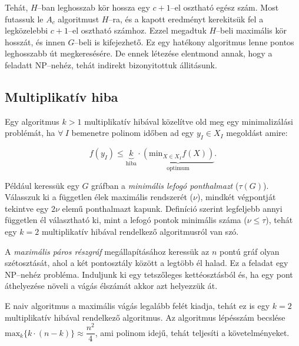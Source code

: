 Tehát, $H$--ban leghosszab kör hossza egy $c+1$--el osztható egész szám.  Most
futassuk le $A_c$ algoritmust $H$--ra, és a kapott eredményt kerekitsük fel a
legközelebbi $c+1$--el osztható számhoz. Ezzel megadtuk $H$--beli maximális kör
hosszát, és innen $G$--beli is kifejezhető. Ez egy hatékony algoritmus lenne
pontos leghosszabb út megkeresésére. De ennek létezése elentmond annak, hogy a
feladatt NP--nehéz, tehát indirekt bizonyitottuk állitásunk.

\subsection{Multiplikatív hiba}

Egy algoritmus $k>1$ multiplikatív hibával közelítve old meg egy minimalizálási
problémát, ha $\forall~I$ bemenetre polinom időben ad egy $y_I \in X_I$
megoldást amire:


\[
	f(y_I) \leq \underbrace{k}_{\mbox{hiba}}  \cdot \underbrace{(\mbox{min}_{X \in X_I} f(X))}_{\mbox{optimum}}.
\]

Például keressük egy $G$ gráfban a \emph{minimális lefogó ponthalmazt} ($\tau(G)$).
Válasszuk ki a független élek maximális rendszerét ($\nu$), mindkét végpontját
tekintve egy $2\nu$ elemű ponthalmazt kapunk. Definíció szerint legfeljebb annyi
független él választható ki, mint a lefogó pontok minimális száma ($\nu \leq
	\tau$), tehát egy $k=2$ multiplikatív hibával rendelkező algoritmusról van szó.

A \emph{maximális páros részgráf} megállapításához keressük az $n$ pontú gráf olyan
szétosztását, ahol a két pontosztály között a legtöbb él halad. Ez a feladat egy
NP--nehéz probléma. Induljunk ki egy tetszőleges kettéosztásból és, ha egy pont
áthelyezése növeli a vágás élszámát akkor azt helyezzük át.

E naiv algoritmus a maximális vágás legalább felét kiadja, tehát ez is egy $k=2$
multiplikatív hibával rendelkező algoritmus. Az algoritmus lépésszám becslése
$\mbox{max}_k\{k\cdot(n-k)\}\approx \dfrac{n^2}{4}$, ami polinom idejű, tehát teljesíti
a követelményeket.
